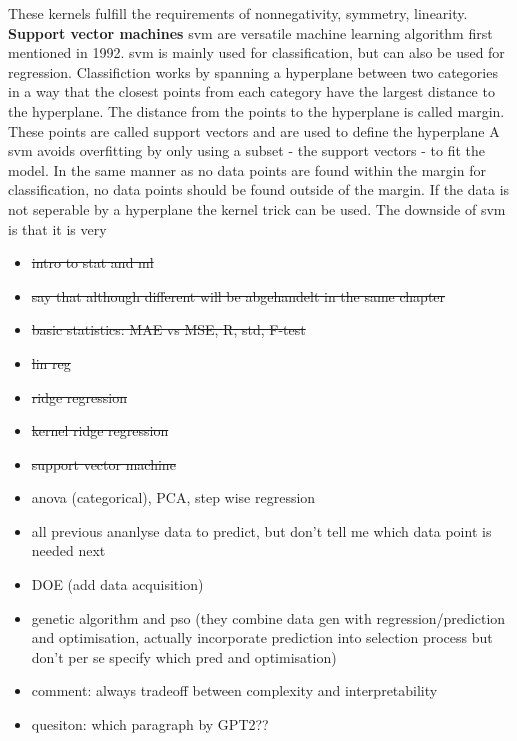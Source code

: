 These kernels fulfill the requirements of nonnegativity, symmetry, linearity\cite{rupp2015machine}.
%
%
\textbf{Support vector machines} 
\Gls{svm} are versatile machine learning algorithm first mentioned in 1992\cite{boser1992training}. 
\Gls{svm} is mainly used for classification, but can also be used for regression. 
Classifiction works by spanning a hyperplane between two categories in a way that the closest points from each category have the largest distance to the hyperplane. 
The distance from the points to the hyperplane is called margin.
These points are called support vectors and are used to define the hyperplane 
A \gls{svm} avoids overfitting by only using a subset - the support vectors - to fit the model. 
In the same manner as no data points are found within the margin for classification, 
no data points should be found outside of the margin. 
If the data is not seperable by a hyperplane the kernel trick can be used. 
The downside of \gls{svm} is that it is very
    
\begin{itemize}
    \item \sout{intro to stat and ml}
    \item \sout{say that although different will be abgehandelt in the same chapter}
    \item \sout{basic statistics: MAE vs MSE, R, std, F-test} 
    \item \sout{lin reg}
    \item \sout{ridge regression}
    \item \sout{kernel ridge regression}
    \item \sout{support vector machine}
    \item anova (categorical), PCA, step wise regression
    \item all previous ananlyse data to predict, but don't tell me which data point is needed next 
    \item DOE (add data acquisition)
    \item genetic algorithm and pso (they combine data gen with regression/prediction and optimisation, actually incorporate prediction into selection process but don't per se specify which pred and optimisation)
    \item comment: always tradeoff between complexity and interpretability
    \item quesiton: which paragraph by GPT2?? 
\end{itemize}

